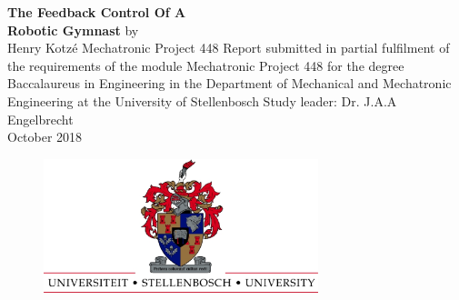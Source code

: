 
\begin{titlingpage}
	
	{	\centering
		\vfill
		\textbf{\Huge
			The Feedback Control Of A\\ 
			\vskip0.5cm
			Robotic Gymnast}
		\vskip0.5cm
		\normalsize by \\
		\vskip0.5cm
		\Large Henry Kotz\'{e} 
		\vskip1cm
		\large Mechatronic Project 448 
		\vskip2cm
		\small Report submitted in partial fulfilment of the requirements of
		the module Mechatronic Project 448 for the degree Baccalaureus in
		Engineering in the Department of Mechanical and Mechatronic
		Engineering at the University of Stellenbosch 
		\vskip2cm
		\large Study leader: Dr. J.A.A Engelbrecht\\
		\vskip2cm
			\large October 2018\\
	}    
	\vfill
	\begin{figure}[t!]
		\includegraphics[width=8cm]{UScrest-top.eps}
		\centering
		\vskip0.5cm
	\end{figure}
	\vfill
	\vfill
\end{titlingpage}